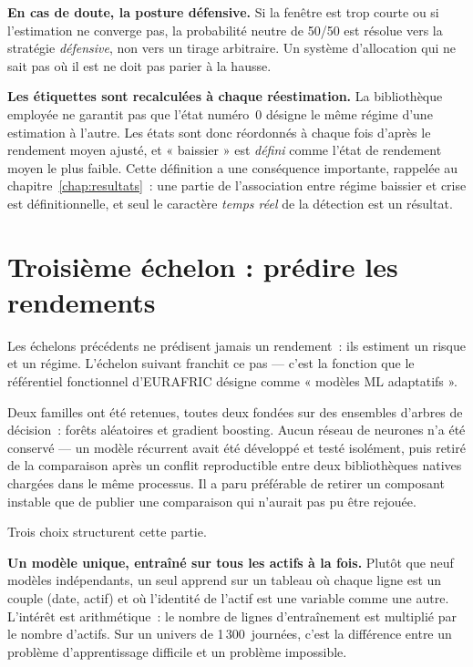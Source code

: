 \textbf{En cas de doute, la posture défensive.} Si la fenêtre est trop courte ou
si l'estimation ne converge pas, la probabilité neutre de 50/50 est résolue vers
la stratégie \emph{défensive}, non vers un tirage arbitraire. Un système
d'allocation qui ne sait pas où il est ne doit pas parier à la hausse.

\textbf{Les étiquettes sont recalculées à chaque réestimation.} La bibliothèque
employée ne garantit pas que l'état numéro~0 désigne le même régime d'une
estimation à l'autre. Les états sont donc réordonnés à chaque fois d'après le
rendement moyen ajusté, et « baissier » est \emph{défini} comme l'état de
rendement moyen le plus faible. Cette définition a une conséquence importante,
rappelée au chapitre~\ref{chap:resultats}~: une partie de l'association entre
régime baissier et crise est définitionnelle, et seul le caractère
\emph{temps réel} de la détection est un résultat.

\section{Troisième échelon : prédire les rendements}

Les échelons précédents ne prédisent jamais un rendement~: ils estiment un
risque et un régime. L'échelon suivant franchit ce pas — c'est la fonction que
le référentiel fonctionnel d'EURAFRIC désigne comme « modèles ML adaptatifs ».

Deux familles ont été retenues, toutes deux fondées sur des ensembles d'arbres de
décision~: forêts aléatoires et gradient boosting. Aucun réseau de neurones n'a
été conservé — un modèle récurrent avait été développé et testé isolément, puis
retiré de la comparaison après un conflit reproductible entre deux bibliothèques
natives chargées dans le même processus. Il a paru préférable de retirer un
composant instable que de publier une comparaison qui n'aurait pas pu être
rejouée.

Trois choix structurent cette partie.

\textbf{Un modèle unique, entraîné sur tous les actifs à la fois.} Plutôt que
neuf modèles indépendants, un seul apprend sur un tableau où chaque ligne est un
couple (date, actif) et où l'identité de l'actif est une variable comme une
autre. L'intérêt est arithmétique~: le nombre de lignes d'entraînement est
multiplié par le nombre d'actifs. Sur un univers de 1\,300~journées, c'est la
différence entre un problème d'apprentissage difficile et un problème
impossible.

